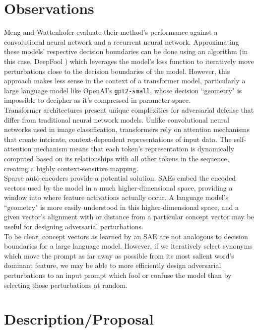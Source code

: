 \documentclass{article}
\begin{document}
\section*{Observations}

Meng and Wattenhofer evaluate their method's performance against a convolutional neural network and a recurrent neural network. Approximating these models' respective decision boundaries can be done using an algorithm (in this case, DeepFool \citep{deepfool}) which leverages the model's loss function to iteratively move perturbations close to the decision boundaries of the model. However, this approach makes less sense in the context of a transformer model, particularly a large language model like OpenAI's \texttt{gpt2-small}, whose decision ``geometry" is impossible to decipher as it's compressed in parameter-space.\\ 

Transformer architectures present unique complexities for adversarial defense that differ from traditional neural network models. Unlike convolutional neural networks used in image classification, transformers rely on attention mechanisms that create intricate, context-dependent representations of input data. The self-attention mechanism means that each token's representation is dynamically computed based on its relationships with all other tokens in the sequence, creating a highly context-sensitive mapping. \\

Sparse auto-encoders provide a potential solution. SAEs embed the encoded vectors used by the model in a much higher-dimensional space, providing a window into where feature activations actually occur. A language model's ``geometry" is more easily understood in this higher-dimensional space, and a given vector's alignment with or distance from a particular concept vector may be useful for designing adversarial perturbations.\\ 

To be clear, concept vectors as learned by an SAE are not analogous to decision boundaries for a large language model. However, if we iteratively select synonyms which move the prompt as far away as possible from its most salient word's dominant feature, we may be able to more efficiently design adversarial perturbations to an input prompt which fool or confuse the model than by selecting those perturbations at random. 

\section*{Description/Proposal}
\end{document}
